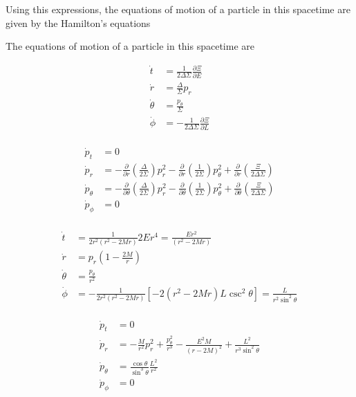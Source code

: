 Using this expressions, the equations of motion of a particle in this spacetime are given by the Hamilton's equations

The equations of motion of a particle in this spacetime are 

\begin{align*}
	\dot{t} &= \frac{1}{2\Delta \Sigma} \frac{\partial \Xi}{\partial E}\\
	\dot{r} &= \frac{\Delta}{\Sigma} p_r \\
	\dot{\theta} &= \frac{p_\theta}{\Sigma}\\
	\dot{\phi} &= - \frac{1}{2\Delta \Sigma} \frac{\partial \Xi}{\partial L}\\	
\end{align*}

\begin{align*}
\dot{p}_t &= 0\\
\dot{p}_r &= -\frac{\partial}{\partial r}\left( \frac{\Delta}{2\Sigma}\right) p_r^2 - \frac{\partial}{\partial r}\left( \frac{1}{2\Sigma}\right) p_\theta^2 + \frac{\partial}{\partial r}\left( \frac{\Xi}{2\Delta \Sigma}\right) \\
\dot{p}_\theta &= -\frac{\partial}{\partial \theta}\left( \frac{\Delta}{2\Sigma}\right) p_r^2 - \frac{\partial}{\partial \theta}\left( \frac{1}{2\Sigma}\right) p_\theta^2 + \frac{\partial}{\partial \theta}\left( \frac{\Xi}{2\Delta \Sigma}\right)\\
\dot{p}_\phi &= 0\\	
\end{align*}



\begin{align*}
	\dot{t} &= \frac{1}{2r^2(r^2 -2Mr)} 2E r^4 = \frac{E r^2}{(r^2 -2Mr)}  \\
	\dot{r} &= p_r \left(1 - \frac{2M}{r} \right)  \\
	\dot{\theta} &= \frac{p_\theta}{r^2}\\
	\dot{\phi} &= - \frac{1}{2r^2(r^2 -2Mr)} \left[ - 2(r^2 -2Mr)L \csc^2 \theta \right] = \frac{L}{r^2 \sin^2 \theta}\\	
\end{align*}

\begin{align*}
\dot{p}_t &= 0\\
\dot{p}_r &= - \frac{M}{r^2}p_r^2 +  \frac{p_\theta^2}{r^3} -\frac{E^2 M}{(r-2M)^2}  + \frac{L^2}{r^3 \sin^2 \theta} \\
\dot{p}_\theta &= \frac{\cos \theta}{\sin^3 \theta} \frac{L^2}{r^2}\\
\dot{p}_\phi &= 0\\	
\end{align*}

